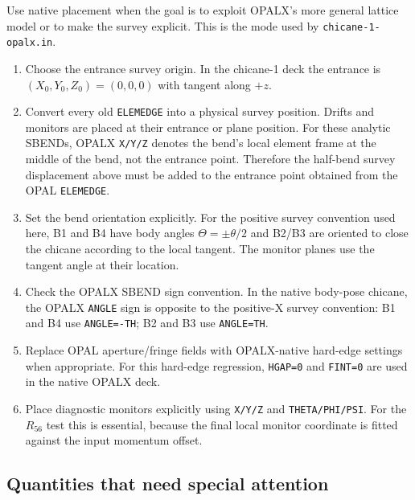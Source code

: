 \documentclass[11pt,a4paper]{article}
\begin{document}
Use native placement when the goal is to exploit OPALX's more general lattice
model or to make the survey explicit.  This is the mode used by
\texttt{chicane-1-opalx.in}.
\begin{enumerate}
  \item Choose the entrance survey origin.  In the chicane-1 deck the entrance
        is \((X_0,Y_0,Z_0)=(0,0,0)\) with tangent along \(+z\).
  \item Convert every old \texttt{ELEMEDGE} into a physical survey position.
        Drifts and monitors are placed at their entrance or plane position.
        For these analytic SBENDs, OPALX \texttt{X/Y/Z} denotes the bend's
        local element frame at the middle of the bend, not the entrance point.
        Therefore the half-bend survey displacement above must be added to
        the entrance point obtained from the OPAL \texttt{ELEMEDGE}.
  \item Set the bend orientation explicitly.  For the positive survey
        convention used here, B1 and B4 have body angles
        \(\Theta=\pm\theta/2\) and B2/B3 are oriented to close the chicane
        according to the local tangent.  The monitor planes use the tangent
        angle at their location.
  \item Check the OPALX SBEND sign convention.  In the native body-pose
        chicane, the OPALX \texttt{ANGLE} sign is opposite to the positive-X
        survey convention: B1 and B4 use \texttt{ANGLE=-TH}; B2 and B3 use
        \texttt{ANGLE=TH}.
  \item Replace OPAL aperture/fringe fields with OPALX-native hard-edge
        settings when appropriate.  For this hard-edge regression,
        \texttt{HGAP=0} and \texttt{FINT=0} are used in the native OPALX
        deck.
  \item Place diagnostic monitors explicitly using \texttt{X/Y/Z} and
        \texttt{THETA/PHI/PSI}.  For the \(R_{56}\) test this is essential,
        because the final local monitor coordinate is fitted against the
        input momentum offset.
\end{enumerate}

\subsection{Quantities that need special attention}
\end{document}
